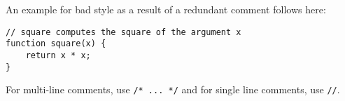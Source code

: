 An example for bad style as a result of a redundant comment follows here:
\begin{lstlisting}
// square computes the square of the argument x
function square(x) {
    return x * x;
}
\end{lstlisting}
%
For multi-line comments, use \lstinline{/* ... */} and for single line comments, use \lstinline{//}.



      
